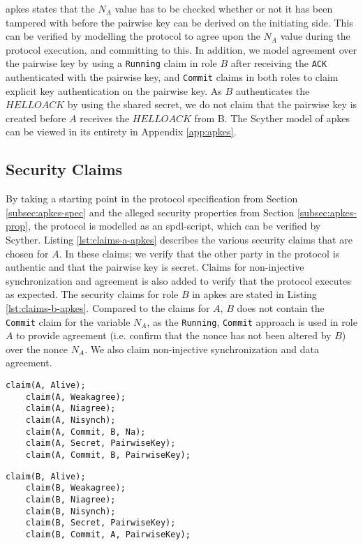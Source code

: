 \gls{apkes} states that the $N_A$ value has to be checked whether or not it has been tampered with before the pairwise key can be derived on the initiating side. This can be verified by modelling the protocol to agree upon the $N_A$ value during the protocol execution, and committing to this. In addition, we model agreement over the pairwise key by using a \texttt{Running} claim in role $B$ after receiving the \texttt{ACK} authenticated with the pairwise key, and \texttt{Commit} claims in both roles to claim explicit key authentication on the pairwise key. As $B$ authenticates the $HELLOACK$ by using the shared secret, we do not claim that the pairwise key is created before $A$ receives the $HELLOACK$ from B. The Scyther model of \gls{apkes} can be viewed in its entirety in Appendix \ref{app:apkes}.

\subsection{Security Claims}

By taking a starting point in the protocol specification from Section \ref{subsec:apkes-spec} and the alleged security properties from Section \ref{subsec:apkes-prop}, the protocol is modelled as an \gls{spdl}-script, which can be verified by Scyther. Listing \ref{lst:claims-a-apkes} describes the various security claims that are chosen for $A$. In these claims; we verify that the other party in the protocol is authentic and that the pairwise key is secret. Claims for non-injective synchronization and agreement is also added to verify that the protocol executes as expected. The security claims for role $B$ in \gls{apkes} are stated in Listing \ref{lst:claims-b-apkes}. Compared to the claims for $A$, $B$ does not contain the \texttt{Commit} claim for the variable $N_A$, as the \texttt{Running}, \texttt{Commit} approach is used in role $A$ to provide agreement (i.e. confirm that the nonce has not been altered by $B$) over the nonce $N_A$. We also claim non-injective synchronization and data agreement.\\

\begin{lstlisting}[caption={Security claims for role A in APKES.}, label={lst:claims-a-apkes}]
	claim(A, Alive);
	claim(A, Weakagree);
	claim(A, Niagree);
	claim(A, Nisynch);
	claim(A, Commit, B, Na);
	claim(A, Secret, PairwiseKey);
	claim(A, Commit, B, PairwiseKey);
\end{lstlisting}


\begin{lstlisting}[caption={Security claims for role B in APKES.}, label={lst:claims-b-apkes}]
	claim(B, Alive);
	claim(B, Weakagree);
	claim(B, Niagree);
	claim(B, Nisynch);
	claim(B, Secret, PairwiseKey);
	claim(B, Commit, A, PairwiseKey);
\end{lstlisting}


